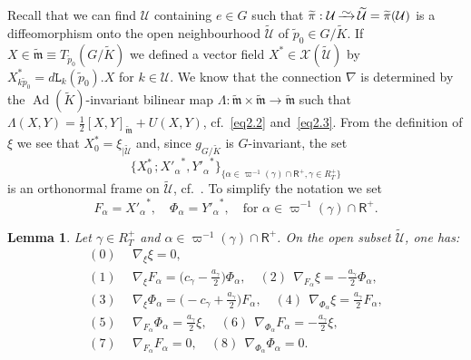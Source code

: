 \documentclass[a4paper,reqno]{amsart}
\newtheorem{lem}[thm]{Lemma}
\theoremstyle{definition}
\theoremstyle{remark}
\theoremstyle{plain}
\numberwithin{equation}{section}
\newcommand{\calX}{{\mathcal{X}}}
\def\preisomto{\vbox{\hbox to
               14pt{\hfill$\sim$\hfill}\nointerlineskip\vskip -0.2pt
               \hbox to 14pt{\rightarrowfill}}}
\def\isomto{\mathop{\preisomto}}
\DeclareMathOperator{\Ad}{{Ad}}
\newcommand{\proots}{\mathsf{R}^+}
\newcommand{\Kt}{{\widetilde{K}}}
\newcommand{\wK}{{\widetilde{K}}}
\newcommand{\Ut}{{\widetilde{\mathcal{U}}}}
\newcommand{\wm}{{\widetilde{\mathfrak{m}}}}
\newcommand{\wpi}{{\widetilde{\pi}}}
\newcommand{\wpzero}{{\tilde{p}_0}}
\newcommand{\ltr}{\mathtt{L}}
\newcommand{\half}{{\frac{1}{2}}}
\begin{document}
Recall that we can find  $\mathcal{U}$ containing $e \in G$  such that $\wpi : \mathcal{U} \isomto \Ut= \wpi(\mathcal{U})$
is a diffeomorphism onto the open neighbourhood $\Ut$ of $\wpzero
\in G/\Kt$. If $X \in \wm \equiv T_\wpzero (G/\Kt)$ we defined a
vector field $X^* \in \calX(\Ut)$ by $X^*_{k\wpzero} =
d\ltr_k(\wpzero).X$ for $k \in \mathcal{U}$.
We know that the connection $\nabla$ is determined by
the $\Ad(\wK)$-invariant bilinear map
$\Lambda: \wm \times \wm \to \wm$ such that
$\Lambda(X,Y)= \half[X,Y]_{\wm} +U(X,Y)$, 
cf.~\eqref{eq2.2} and~\eqref{eq2.3}.
From the definition of $\xi$ we see that $X_0^* = \xi_{\mid \Ut}$
and, since $g_{\scriptscriptstyle{G/\wK}}$ is $G$-invariant, the set
\[
\bigl\{X_0^* \, ; 
{X'_\alpha}^*,  {Y'_\alpha}^* \bigr\}_{\{\alpha \in 
\varpi^{-1}(\gamma) \cap \proots, \gamma \in R_T^+\}}
\]
is an orthonormal frame on $\Ut$,  cf.~\cite[p.~51]{Nom}. To simplify the
notation we set
\[
F_\alpha= {X'_\alpha}^*, \quad \Phi_\alpha = {Y'_\alpha}^*, \quad
\text{for $\alpha \in \varpi^{-1}(\gamma) \cap \proots$.}
\]


\begin{lem}
  \label{lem6.15}
  Let $\gamma \in  R_T^+$ and
  $\alpha \in \varpi^{-1}(\gamma) \cap \proots$.  On the open subset $\Ut$,
  one has:
   \begin{align*}
     (0) & \ \ \nabla_\xi\xi = 0, \\
    (1) & \ \ \nabla_\xi F_\alpha  = \bigl(c_\gamma
          -\frac{a_\gamma}{2}\bigr) \Phi_\alpha, 
    \quad (2) \ \ \nabla_{F_\alpha} \xi = -\frac{a_\gamma}{2}
    \Phi_\alpha,
    \\  (3) & \ \ \nabla_\xi \Phi_\alpha  = \bigl(-c_\gamma +
         \frac{a_\gamma}{2}\bigr) F_\alpha, 
    \quad (4) \ \ \nabla_{\Phi_\alpha} \xi = \frac{a_\gamma}{2}
    F_\alpha,
    \\
   (5) & \ \ \nabla_{F_\alpha} \Phi_\alpha  = \frac{a_\gamma}{2}\xi,
    \quad (6)\ \ \nabla_{\Phi_\alpha} F_\alpha = -\frac{a_\gamma}{2}
    \xi,
    \\
     (7) & \ \ \nabla_{F_\alpha} F_\alpha  = 0,
    \quad (8) \ \ \nabla_{\Phi_\alpha} \Phi_\alpha = 0.
  \end{align*}
 \end{lem}
\end{document}
